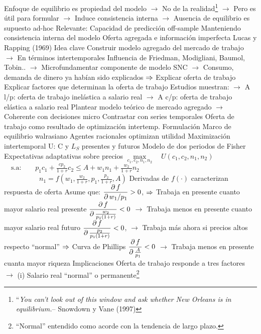 \documentclass{nuevotema}
\begin{document}
\begin{esquemal}
				\4[] Enfoque de equilibrio es propiedad del modelo
				\4[] $\to$ No de la realidad\footnote{``\textit{You can't look out of this window and ask whether New Orleans is in equilibrium.}-- Snowdown y Vane (1997)}
				\4[] $\to$ Pero es útil para formular
				\4[] $\to$ Induce consistencia interna
				\4[] $\to$ Ausencia de equilibrio es supuesto ad-hoc
				\4 Relevante:
				\4[] Capacidad de predicción off-sample
				\4[] Manteniendo consistencia interna del modelo
	\1 
		\2 Oferta agregada e información imperfecta
			\3 Lucas y Rapping (1969)
				\4 Idea clave
				\4[] Construir modelo agregado del mercado de trabajo
				\4[] $\to$ En términos intertemporales
				\4[] Influencia de Friedman, Modigliani, Baumol, Tobin..
				\4[] $\to$ Microfundamentar componente de modelo SNC
				\4[] $\to$ Consumo, demanda de dinero ya habían sido explicados
				\4[] $\Rightarrow$ Explicar oferta de trabajo
				\4[] Explicar factores que determinan la oferta de trabajo
				\4[] Estudios muestran:
				\4[] $\to$ A l/p: oferta de trabajo inelástica a salario real
				\4[] $\to$ A c/p: oferta de trabajo elástica a salario real
				\4[] Plantear modelo teórico de mercado agregado
				\4[] $\to$ Coherente con decisiones micro
				\4[] Contrastar con series temporales
				\4[] Oferta de trabajo como resultado de optimización intertemp.
				\4 Formulación
				\4[] Marco de equilibrio walrasiano
				\4[] Agentes racionales optimizan utilidad
				\4[] Maximización intertemporal U: C y $L_S$ presentes y futuros
				\4[] Modelo de dos periodos de Fisher
				\4[] Expectativas adaptativas sobre precios
				\4[] $\underset{c_1,c_2,n_1,n_2}{\max} \quad U(c_1, c_2, n_1, n_2)$
				\4[] $\quad \text{s.a:} \quad \quad p_1 c_1 + \frac{cp_2}{1+r} c_2 \leq A + w_1 n_1 + \frac{w_2}{1+r} n_2$
				\4[] $\quad \quad \quad \quad \quad n_1 = f(w_1, \frac{w_2}{1+r}, p_1, \frac{p_2}{1+r},A)$
				\4[] Derivadas de $f(\cdot)$ caracterizan respuesta de oferta
				\4[] Asume que:
				\4[] $\dfrac{\partial \, f}{\partial \, w_1/p_1} > 0$,
				\4[] $\Rightarrow$ Trabaja en presente cuanto mayor salario real presente
				\4[] $\dfrac{\partial \, f}{\partial \, \frac{w_2}{p_1(1+r)}} < 0$
				\4[] $\to$ Trabaja menos en presente cuanto mayor salario real futuro
				\4[] $\dfrac{\partial \, f}{\partial \, \frac{p_2}{p_1 (1+r)} }<0$,
				\4[] $\to$ Trabaja más ahora si precios altos respecto ``normal''
				\4[] $\Rightarrow$ Curva de Phillips
				\4[] $\dfrac{\partial \, f}{\partial \,  \frac{A}{p_1}}<0$
				\4[] $\to$ Trabaja menos en presente cuanta mayor riqueza
				\4 Implicaciones
				\4[] Oferta de trabajo responde a tres factores
				\4[] $\to$ (i) Salario real ``normal'' o permanente\footnote{``Normal'' entendido como acorde con la tendencia de largo plazo.}

\end{esquemal}
\end{document}
